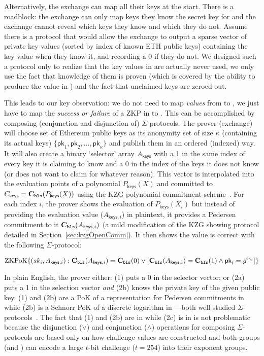Alternatively, the exchange can map all their keys at the start. There is a roadblock: the exchange can only map keys they know the secret key for and the exchange cannot reveal which keys they know and which they do not. Assume there is a protocol that would allow the exchange to output a sparse vector of \bls private key values (sorted by index of known ETH public keys) containing the key value when they know it, and recording a 0 if they do not. We designed such a protocol only to realize that the key values in \bls are actually never used, we only use the fact that knowledge of them is proven (which is covered by the ability to produce the value in \bls) and the fact that unclaimed keys are zeroed-out. 

This leads to our key observation: we do not need to map \textit{values} from \secp to \bls, we just have to map the \textit{success or failure} of a ZKP in \secp to \bls. This can be accomplished by composing (conjunction and disjunction of) $\Sigma$-protocols. The prover (exchange) will choose set of Ethereum public keys as its anonymity set of size $\kappa$ (containing its actual keys) $\{\mathsf{pk}_1,\mathsf{pk}_2,\dots,\mathsf{pk}_\kappa\}$ and publish them in an ordered (indexed) way. It will also create a binary `selector' array $A_\mathsf{keys}$ with a 1 in the same index of every key it is claiming to know and a 0 in the index of the keys it does not know (or does not want to claim for whatever reason). This vector is interpolated into the evaluation points of a polynomial $P_\mathsf{keys}(X)$  and committed to $C_\mathsf{keys}=\textbf{C}_\texttt{bls}(P_\mathsf{keys}(X))$ using the KZG polynomial commitment scheme~\cite{kzg}. For each index $i$, the prover shows the evaluation of $P_\mathsf{keys}(X_i)$ but instead of providing the evaluation value ($A_{\mathsf{keys},i}$) in plaintext, it provides a Pedersen commitment to it $\textbf{C}_\texttt{bls}(A_{\mathsf{keys},i})$ (a mild modification of the KZG showing protocol detailed in Section~\ref{sec:kzgOpenComm}). It then shows the value is correct with the following $\Sigma$-protocol:

\[ \mathrm{ZKPoK} \{ (sk_i,A_{\mathsf{keys},i}) : \textbf{C}_\texttt{bls}(A_{\mathsf{keys},i})=\textbf{C}_\texttt{bls}(0) \lor [\textbf{C}_\texttt{bls}(A_{\mathsf{keys},i})=\textbf{C}_\texttt{bls}(1) \land \mathsf{pk}_i=g^{\mathsf{sk}_i} ] \} \]

In plain English, the prover either: (1) puts a 0 in the selector vector; or (2a) puts a 1 in the selection vector \textit{and} (2b) knows the private key of the given public key. (1) and (2b) are a PoK of a representation for Pedersen commitments in \bls while (2b) is a Schnorr PoK of a discrete logarithm in \secp---both well studied $\Sigma$-protocols~\cite{damgard10,sigma}. The fact that (1) and (2b) are in \bls while (2c) is in \secp is not problematic because the disjunction ($\lor$) and conjunction ($\land$) operations for composing $\Sigma$-protocols are based only on how challenge values are constructed and both groups (\secp and \bls) can encode a large $t$-bit challenge (\eg $t=254$) into their exponent groups. 

